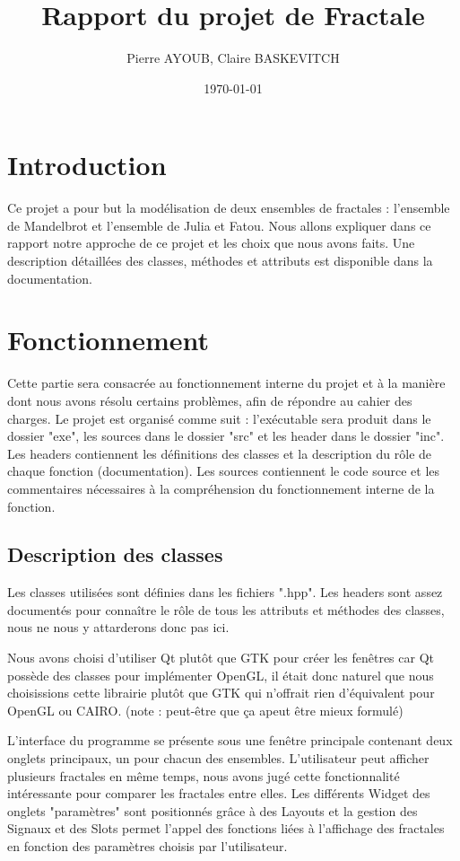 \documentclass[11pt]{article}
\title{Rapport du projet de Fractale}
\author{Pierre AYOUB, Claire BASKEVITCH}
\date\today
\begin{document}
\maketitle

\section{Introduction}

Ce projet a pour but la modélisation de deux ensembles de fractales : 
l'ensemble de Mandelbrot et l'ensemble de Julia et Fatou.
Nous allons expliquer dans ce rapport notre approche de ce projet 
et les choix que nous avons faits.
Une description détaillées des classes, méthodes et attributs est 
disponible dans la documentation.

\section{Fonctionnement}

Cette partie sera consacrée au fonctionnement interne du projet
et à la manière dont nous avons résolu certains problèmes, afin de 
répondre au cahier des charges. Le projet est organisé comme suit : 
l'exécutable sera produit dans le dossier "exe", les sources dans le dossier "src"
et les header dans le dossier "inc".
Les headers contiennent les définitions des classes et la description du rôle
de chaque fonction (documentation). Les sources contiennent le code source
et les commentaires nécessaires à la compréhension du fonctionnement
interne de la fonction.

\subsection{Description des classes}

Les classes utilisées sont définies dans les fichiers ".hpp". Les headers 
sont assez documentés pour connaître le rôle de tous les attributs et 
méthodes des classes, nous ne nous y attarderons donc pas ici.


Nous avons choisi d'utiliser Qt plutôt que GTK pour créer les fenêtres 
car Qt possède des classes pour implémenter OpenGL, il était donc 
naturel que nous choisissions cette librairie plutôt que GTK qui n'offrait
rien d'équivalent pour OpenGL ou CAIRO. (note : peut-être que ça apeut être 
mieux formulé)


L'interface du programme se présente sous une fenêtre principale 
contenant deux onglets principaux, un pour chacun des ensembles. 
L'utilisateur peut afficher plusieurs fractales en même temps, nous avons 
jugé cette fonctionnalité intéressante pour comparer les fractales entre elles.
Les différents Widget des onglets "paramètres" sont positionnés grâce à 
des Layouts et la gestion des Signaux et des Slots permet l'appel des fonctions 
liées à l'affichage des fractales en fonction des paramètres choisis par 
l'utilisateur.  
\end{document}
